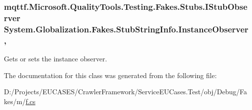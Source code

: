 \hypertarget{class_system_1_1_globalization_1_1_fakes_1_1_stub_string_info_a3eb9aa416ee901e22aaba301b5e06c1b}{
\subsubsection[{Instance\-Observer}]{\setlength{\rightskip}{0pt plus 5cm}mqttf.\-Microsoft.\-Quality\-Tools.\-Testing.\-Fakes.\-Stubs.\-I\-Stub\-Observer System.\-Globalization.\-Fakes.\-Stub\-String\-Info.\-Instance\-Observer\hspace{0.3cm}{\ttfamily [get]}, {\ttfamily [set]}}}\label{class_system_1_1_globalization_1_1_fakes_1_1_stub_string_info_a3eb9aa416ee901e22aaba301b5e06c1b}


Gets or sets the instance observer.



The documentation for this class was generated from the following file\-:\begin{DoxyCompactItemize}
\item 
D\-:/\-Projects/\-E\-U\-C\-A\-S\-E\-S/\-Crawler\-Framework/\-Service\-E\-U\-Cases.\-Test/obj/\-Debug/\-Fakes/m/\hyperlink{m_2f_8cs}{f.\-cs}\end{DoxyCompactItemize}
